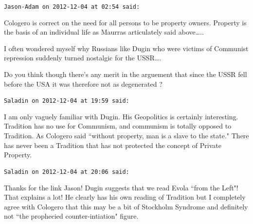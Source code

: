 \begin{footnotesize}
\begin{sffamily}
\hfill

\texttt{Jason-Adam on 2012-12-04 at 02:54 said: }

Cologero is correct on the need for all persons to be property owners. Property is the basis of an individual life as Maurras articulately said above…..

I often wondered myself why Russians like Dugin who were victims of Communist repression suddenly turned nostalgic for the USSR….

Do you think though there's any merit in the arguement that since the USSR fell before the USA it was therefore not as degenerated ?


\hfill

\texttt{Saladin on 2012-12-04 at 19:59 said: }

I am only vaguely familiar with Dugin. His Geopolitics is certainly interesting. Tradition has no use for Communism, and communism is totally opposed to Tradition. As Cologero said ``without property, man is a slave to the state." There has never been a Tradition that has not protected the concept of Private Property.


\hfill

\texttt{Saladin on 2012-12-04 at 20:06 said: }

Thanks for the link Jason! Dugin suggests that we read Evola ``from the Left"! That explains a lot! He clearly has his own reading of Tradition but I completely agree with Cologero that this may be a bit of Stockholm Syndrome and definitely not ``the prophecied counter-intiation" figure.


\end{sffamily}\end{footnotesize}
